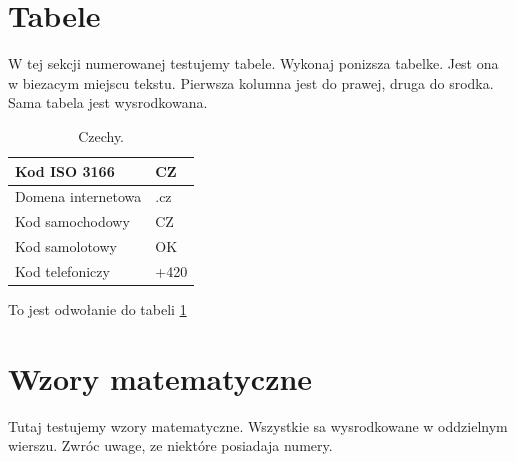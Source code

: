 \documentclass[11pt,a4paper]{article}
\begin{document}
\section{Tabele}
W tej sekcji numerowanej testujemy tabele. Wykonaj ponizsza tabelke. Jest
ona w biezacym miejscu tekstu. Pierwsza kolumna jest do prawej, druga do
srodka. Sama tabela jest wysrodkowana.
\\
\begin{table}[h]
\centering
\begin{tabular}{|l|l|}
\hline
Kod ISO 3166       & CZ   \\ \hline
Domena internetowa & .cz  \\ \hline
Kod samochodowy    & CZ   \\ \hline
Kod samolotowy     & OK   \\ \hline
Kod telefoniczy    & +420 \\ \hline
\end{tabular}
\caption{Czechy.}
\label{table:1}
\end{table}
To jest odwołanie do tabeli \ref{table:1}
\section{Wzory matematyczne}
Tutaj testujemy wzory matematyczne. Wszystkie sa wysrodkowane w oddzielnym
wierszu. Zwróc uwage, ze niektóre posiadaja numery.
\end{document}
